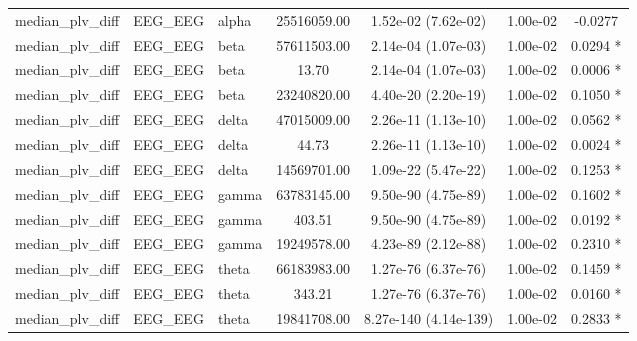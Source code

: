 \begin{tabular}{l l l c c c c}
    median\_plv\_diff & EEG\_EEG & alpha & 25516059.00 & 1.52e-02 (7.62e-02) & 1.00e-02 & -0.0277  \\
    median\_plv\_diff & EEG\_EEG & beta & 57611503.00 & 2.14e-04 (1.07e-03) & 1.00e-02 & 0.0294 * \\
    median\_plv\_diff & EEG\_EEG & beta & 13.70 & 2.14e-04 (1.07e-03) & 1.00e-02 & 0.0006 * \\
    median\_plv\_diff & EEG\_EEG & beta & 23240820.00 & 4.40e-20 (2.20e-19) & 1.00e-02 & 0.1050 * \\
    median\_plv\_diff & EEG\_EEG & delta & 47015009.00 & 2.26e-11 (1.13e-10) & 1.00e-02 & 0.0562 * \\
    median\_plv\_diff & EEG\_EEG & delta & 44.73 & 2.26e-11 (1.13e-10) & 1.00e-02 & 0.0024 * \\
    median\_plv\_diff & EEG\_EEG & delta & 14569701.00 & 1.09e-22 (5.47e-22) & 1.00e-02 & 0.1253 * \\
    median\_plv\_diff & EEG\_EEG & gamma & 63783145.00 & 9.50e-90 (4.75e-89) & 1.00e-02 & 0.1602 * \\
    median\_plv\_diff & EEG\_EEG & gamma & 403.51 & 9.50e-90 (4.75e-89) & 1.00e-02 & 0.0192 * \\
    median\_plv\_diff & EEG\_EEG & gamma & 19249578.00 & 4.23e-89 (2.12e-88) & 1.00e-02 & 0.2310 * \\
    median\_plv\_diff & EEG\_EEG & theta & 66183983.00 & 1.27e-76 (6.37e-76) & 1.00e-02 & 0.1459 * \\
    median\_plv\_diff & EEG\_EEG & theta & 343.21 & 1.27e-76 (6.37e-76) & 1.00e-02 & 0.0160 * \\
    median\_plv\_diff & EEG\_EEG & theta & 19841708.00 & 8.27e-140 (4.14e-139) & 1.00e-02 & 0.2833 * \\
    \bottomrule
\end{tabular}